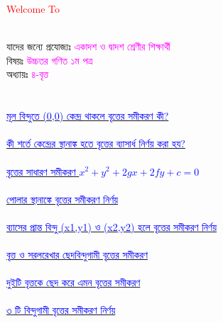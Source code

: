 \documentclass{article}
\begin{document}
 
	\Large
	\textcolor{red}{Welcome To} 
	\\
	\\
	যাদের জন্যে প্রযোজ্যঃ  	\textcolor{magenta}{একাদশ ও দ্বাদশ শ্রেণীর শিক্ষার্থী} \\
	বিষয়ঃ \textcolor{magenta}{উচ্চতর গণিত ১ম পত্র} \\
	অধ্যায়ঃ \textcolor{magenta}{৪-বৃত্ত}\\ 
	\\
	\\
	\href{https://www.youtube.com/watch?v=DRxNte3mU6U&list=PLIjPH8h-K22w5iYZogyV1AI8-baSpY2Qn&index=1}{\textcolor{blue}{মূল বিন্দুতে (0,0) কেন্দ্র থাকলে বৃত্তের সমীকরণ কী?}}\\
	\\
	\href{https://www.youtube.com/watch?v=rGCA1MltZsY&list=PLIjPH8h-K22w5iYZogyV1AI8-baSpY2Qn&index=2}{\textcolor{blue}{কী শর্তে কেন্দ্রের স্থানাঙ্ক হতে বৃত্তের ব্যাসার্ধ নির্ণয় করা হয়?}}\\
	\\
	\href{https://www.youtube.com/watch?v=gehIW-_0XrQ&list=PLIjPH8h-K22w5iYZogyV1AI8-baSpY2Qn&index=3}{\textcolor{blue}{বৃত্তের সাধারণ সমীকরণ $x^2+y^2+2gx+2fy+c=0$}}\\
	\\
	\href{https://www.youtube.com/watch?v=WzuG-MuA6Cs&list=PLIjPH8h-K22w5iYZogyV1AI8-baSpY2Qn&index=4}{\textcolor{blue}{পোলার স্থানাঙ্কে বৃত্তের সমীকরণ নির্ণয়}}\\
	\\
	\href{https://www.youtube.com/watch?v=ssCuBx7HEHI&list=PLIjPH8h-K22w5iYZogyV1AI8-baSpY2Qn&index=5}{\textcolor{blue}{ব্যাসের প্রান্ত বিন্দু (x1,y1) ও (x2,y2) হলে বৃত্তের সমীকরণ নির্ণয়}}\\
	\\
	\href{https://www.youtube.com/watch?v=afVjGQrIpDs&list=PLIjPH8h-K22w5iYZogyV1AI8-baSpY2Qn&index=6}{\textcolor{blue}{বৃত্ত ও সরলরেখার ছেদবিন্দুগামী বৃত্তের সমীকরণ}}\\
	\\
	\href{https://www.youtube.com/watch?v=rXOyjYE6YfU&list=PLIjPH8h-K22w5iYZogyV1AI8-baSpY2Qn&index=7}{\textcolor{blue}{দুইটি বৃত্তকে ছেদ করে এমন বৃত্তের সমীকরণ}}\\
	\\
	\href{https://www.youtube.com/watch?v=iQIWTRqZsAY}{\textcolor{blue}{৩ টি বিন্দুগামী বৃত্তের সমীকরণ নির্ণয়}}\\
\end{document}
